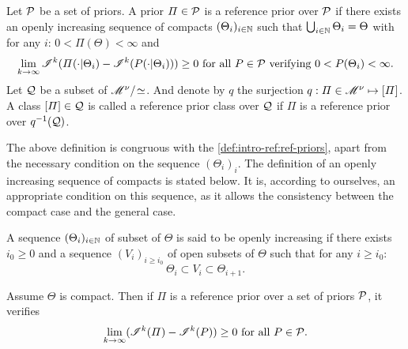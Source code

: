 \begin{defi}
    Let $\mathcal{P}$ be a set of priors. A prior $\varPi\in\mathcal{P}$ is a reference prior over $\mathcal{P}$ if there exists an openly increasing sequence of compacts $(\Theta_i)_{i\in\mathbb{N}}$ such that $\bigcup_{i\in\mathbb{N}}\Theta_i=\Theta$ with for any $i$: $0<\varPi(\Theta)<\infty$ and
    \begin{equation}
        \lim_{k\rightarrow\infty}\sI^k(\varPi(\cdot|\Theta_i) - \sI^k(P(\cdot|\Theta_i)) ) \geq 0 \text{\ for all\ } P\in\cP\text{\ verifying\ }0<P(\Theta_i)<\infty.
    \end{equation}
    Let $\mathcal{Q}$ be a subset of $\mathscr{M}^\nu/\!\simeq$.
    And denote by $q$ the surjection $q:\varPi\in\mathscr{M}^\nu\mapsto[\varPi]$.  
    A class $[\varPi]\in\mathcal{Q}$ is called a reference prior class over $\mathcal{Q}$ if $\varPi$ is a reference prior over $q^{-1}(\mathcal{Q})$.
\end{defi}



The above definition is congruous with the \cref{def:intro-ref:ref-priors}, apart from the necessary condition on the sequence $(\Theta_i)_i$. 
The definition of an openly increasing sequence of compacts
is stated below. It is, according to ourselves, an appropriate condition on this sequence, as it allows the consistency between the compact case and the general case.


\begin{defi}
    A sequence $(\Theta_i)_{i\in \mathbb{N}}$ of subset of $\Theta$ is said to be openly increasing if there exists $i_0\geq0$ and a sequence $(V_i)_{i\geq i_0}$ of open subsets of $\Theta$ such that for any $i\geq i_0$:
    \begin{equation}
        \Theta_i\subset V_i\subset\Theta_{i+1}.
    \end{equation}
\end{defi}

\begin{prop}
    Assume $\Theta$ is compact. Then if $\varPi$ is a reference prior over a set of priors $\mathcal{P}$, it verifies
        \begin{equation}\label{eq:intro-ref:refcompact}
            \lim_{k\rightarrow\infty} (\mathscr{I}^k(\varPi)-\mathscr{I}^k(P)) \geq0\text{\ for all\ } P\in\mathcal{P}.
        \end{equation}
\end{prop}



